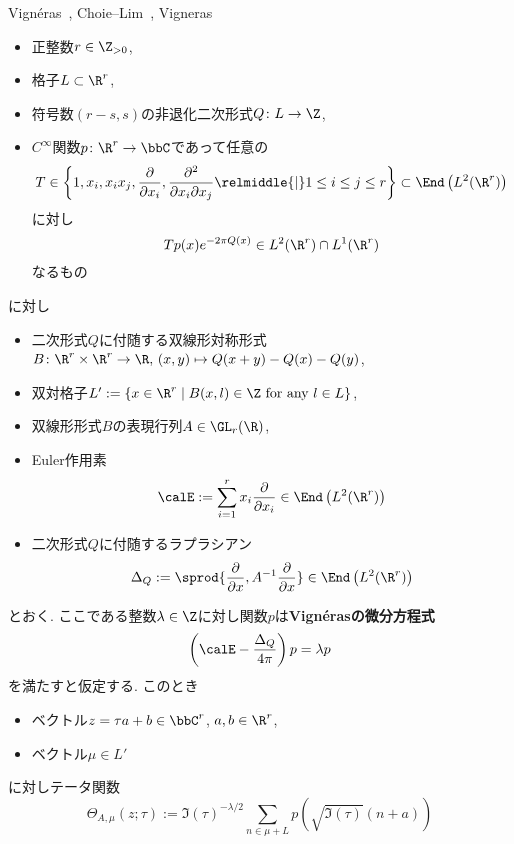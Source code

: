 \documentclass[11pt,b5paper,oneside,lualatex]{ltjsarticle} %
\numberwithin{equation}{section} %
\begin{document}
\begin{thm}{{Vign\'{e}ras~\cite{Vigneras}, Choie--Lim~\cite[Theorem 3.1]{Choie_Lim}, \cite[Theorem 8.27]{BFOR}}}{Vigneras}
	\leavevmode %
	\begin{itemize}
		\item 正整数$ r \in \Z_{>0} $,
		\item 格子$ L \subset \R^r $,
		\item 符号数$ (r-s, s) $の非退化二次形式$ Q \colon L \to \Z $,
		\item $ C^\infty $関数$ p \colon \R^r \to \bbC $であって任意の
		\[
		T \in 
		\left\{ 1, x_i, x_i x_j, \frac{\partial}{\partial x_i}, \frac{\partial^2}{\partial x_i \partial x_j}
		 \relmiddle{|} 1 \le i \le j \le r \right\}
		\subset \End \left( L^2(\R^r) \right)
		\]
		に対し
		\[
		T p(x) e^{-2\pi Q(x)} %
		\in L^2(\R^r) \cap L^1(\R^r)
		\]
		なるもの
	\end{itemize}
	に対し
	\begin{itemize}
		\item 二次形式$ Q $に付随する双線形対称形式$ B \colon \R^r \times \R^r \to \R, \, (x, y) \mapsto Q(x+y) - Q(x) - Q(y) $,
		\item 双対格子$ L' := \{ x \in \R^r \mid B(x, l) \in \Z \text{ for any } l \in L \} $,
		\item 双線形形式$ B $の表現行列$ A \in \GL_r(\R) $,
		\item Euler作用素
		\[
		\calE := \sum_{i=1}^{r} x_i \frac{\partial}{\partial x_i}
		\in \End \left( L^2(\R^r) \right)
		\]
		\item 二次形式$ Q $に付随するラプラシアン
		\[
		\Delta_Q := \sprod{ \frac{\partial}{\partial x}, A^{-1} \frac{\partial}{\partial x} }
		\in \End \left( L^2(\R^r) \right)
		\]
	\end{itemize}
	とおく. 
	ここである整数$ \lambda \in \Z $に対し関数$ p $は\textbf{Vign\'{e}rasの微分方程式}
	\[
	\left( \calE - \frac{\Delta_Q}{4\pi} \right) p = \lambda p
	\]
	を満たすと仮定する. 
	このとき
	\begin{itemize}
		\item ベクトル$ z = \tau a + b \in \bbC^r $, $ a, b \in \R^r $,
		\item ベクトル$ \mu \in L' $
	\end{itemize}
	に対しテータ関数
	\[
	\Theta_{A, \mu} (z; \tau)
	:=
	\Im(\tau)^{-\lambda/2}
	\sum_{n \in \mu + L} p\left( \sqrt{\Im(\tau)} \left( n + a \right) \right)
\]
\end{thm}
\end{document}
